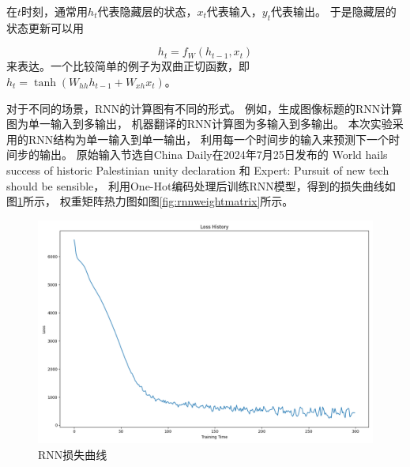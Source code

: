     在$t$时刻，通常用$h_t$代表隐藏层的状态，$x_t$代表输入，$y_t$代表输出。
    于是隐藏层的状态更新可以用

    \begin{equation}
        h_t = f_W (h_{t-1}, x_t)
    \end{equation}
    来表达。一个比较简单的例子为双曲正切函数，即$h_t = \tanh (W_{hh} h_{t-1} + W_{xh} x_t)$。

    对于不同的场景，RNN的计算图有不同的形式。
    例如，生成图像标题的RNN计算图为单一输入到多输出，
    机器翻译的RNN计算图为多输入到多输出。
    本次实验采用的RNN结构为单一输入到单一输出，
    利用每一个时间步的输入来预测下一个时间步的输出。
    原始输入节选自China Daily在2024年7月25日发布的
    World hails success of historic Palestinian unity declaration
    和
    Expert: Pursuit of new tech should be sensible，
    利用One-Hot编码处理后训练RNN模型，得到的损失曲线如图\ref{fig:RNNlosshistory}所示，
    权重矩阵热力图如图\ref{fig:rnnweightmatrix}所示。

    \begin{figure}[H]
        \centering
        \includegraphics[width=0.7\linewidth]{../output/rnn/no scheduler/rnnloss.png}
        \caption{RNN损失曲线}
        \label{fig:RNNlosshistory}
    \end{figure}

